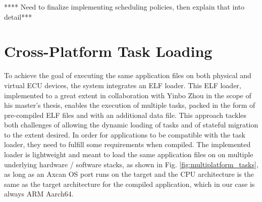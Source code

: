 **** Need to finalize implementing scheduling policies, then explain that into detail***

\section{Cross-Platform Task Loading}

To achieve the goal of executing the same application files on both physical and virtual ECU devices, the system integrates an ELF loader. This ELF loader, implemented to a great extent in collaboration with Yinbo Zhou in the scope of his master's thesis, enables the execution of multiple tasks, packed in the form of pre-compiled ELF files and with an additional data file. This approach tackles both challenges of allowing the dynamic loading of tasks and of stateful migration to the extent desired. In order for applications to be compatible with the task loader, they need to fulfill some requirements when compiled. The implemented loader is lightweight and meant to load the same application files on on multiple underlying hardware / software stacks, as shown in Fig. \ref{fig:multiplatform_tasks}, as long as an Axcan OS port runs on the target and the CPU architecture is the same as the target architecture for the compiled application, which in our case is always ARM Aarch64.


